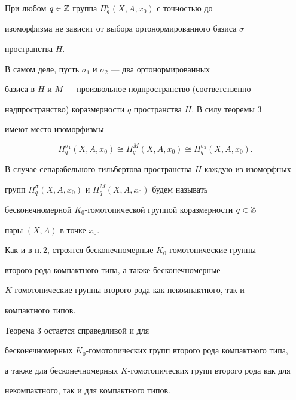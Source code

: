  


\begin{cornonum} 


При любом $q\in\Bbb Z$ группа $\Pi^\sigma_q(X,A,x_0)$ с точностью до 


изоморфизма не зависит от выбора ортонормированного базиса $\sigma$ 


пространства $H$. 


\end{cornonum} 


 


В самом деле, пусть $\sigma_1$ и $\sigma_2$ --- два ортонормированных 


базиса в $H$ и $M$ --- произвольное подпространство (соответственно 


надпространство) коразмерности $q$ пространства $H$. В силу теоремы 3 


имеют место изоморфизмы 


$$ 


\Pi^{\sigma_1}_q(X,A,x_0)\cong \Pi^M_q(X,A,x_0)\cong 


\Pi^{\sigma_2}_q(X,A,x_0). 


$$ 


В случае сепарабельного гильбертова пространства $H$ каждую из изоморфных 


групп $\Pi^\sigma_q(X,A,x_0)$ и $\Pi^M_q(X,A,x_0)$ будем называть 


бесконечномерной $K_0$-гомотопической группой коразмерности $q\in\Bbb Z$ 


пары $(X,A)$ в точке $x_0$. 


 


\begin{note} 


Как и в п.\,2, строятся бесконечномерные $K_0$-гомотопические группы 


второго рода компактного типа, а также бесконечномерные 


$K$-гомотопические группы второго рода как некомпактного, так и 


компактного типов. 


\end{note} 


 


\begin{note} 


Теорема 3 остается справедливой и для 


бесконечномерных $K_0$-гомотопических групп второго рода компактного типа, 


а также для бесконечномерных $K$-гомотопичес\-ких групп второго рода как для 


некомпактного, так и для компактного типов. 


\end{note} 


